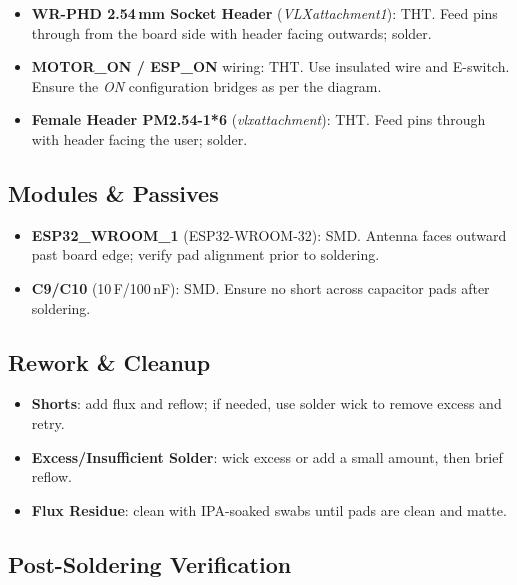 \begin{manualblock}
\begin{itemize}
  \item \textbf{WR-PHD 2.54\,mm Socket Header} (\textit{VLXattachment1}): THT. Feed pins through from the board side with header facing outwards; solder.
  \item \textbf{MOTOR\_ON / ESP\_ON} wiring: THT. Use insulated wire and E-switch. Ensure the \emph{ON} configuration bridges as per the diagram.
  \item \textbf{Female Header PM2.54-1*6} (\textit{vlxattachment}): THT. Feed pins through with header facing the user; solder.
\end{itemize}

\subsection*{Modules \& Passives}
\begin{itemize}
  \item \textbf{ESP32\_WROOM\_1} (ESP32-WROOM-32): SMD. Antenna faces outward past board edge; verify pad alignment prior to soldering.
  \item \textbf{C9/C10} (10\,\textmu F/100\,nF): SMD. Ensure no short across capacitor pads after soldering.
\end{itemize}

\subsection*{Rework \& Cleanup}
\begin{itemize}
  \item \textbf{Shorts}: add flux and reflow; if needed, use solder wick to remove excess and retry.
  \item \textbf{Excess/Insufficient Solder}: wick excess or add a small amount, then brief reflow.
  \item \textbf{Flux Residue}: clean with IPA-soaked swabs until pads are clean and matte.
\end{itemize}

\subsection*{Post-Soldering Verification}


\end{manualblock}
